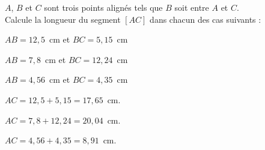$A$, $B$ et $C$ sont trois points alignés tels que $B$ soit entre $A$ et $C$.
\\Calcule la longueur du segment $[AC]$ dans chacun des cas suivants :
\begin{myenumerate}
  \item $AB=12,5$~cm et $BC=5,15$~cm
  \item $AB=7,8$~cm et $BC=12,24$~cm
  \item $AB=4,56$~cm et $BC=4,35$~cm
\end{myenumerate}
\begin{multicols}{3}
  \begin{myenumerate}
  \item $AC=12,5+5,15=17,65$~cm.
  \item $AC=7,8+12,24=20,04$~cm.
  \item $AC=4,56+4,35=8,91$~cm.
\end{myenumerate}
\end{multicols}
